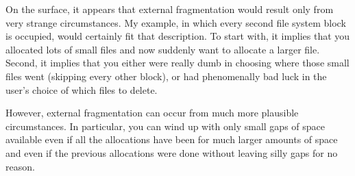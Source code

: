 On the surface, it appears that external fragmentation would result
only from very strange circumstances.  My example, in which every
second file system block is occupied, would certainly fit that
description.  To start with, it implies that you allocated lots of
small files and now suddenly want to allocate a larger file.  Second,
it implies that you either were really dumb in choosing where those
small files went (skipping every other block), or had
phenomenally bad luck in the user's choice of which files to delete.

However, external fragmentation can occur from much more
plausible circumstances.  In particular, you can wind up with only
small gaps of space available even if all the allocations have been
for much larger amounts of space and even if the previous allocations
were done without leaving silly gaps for no reason.

